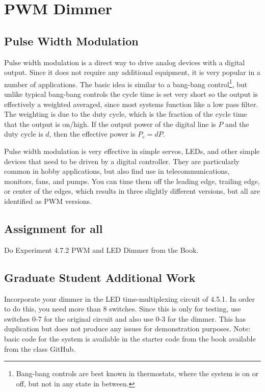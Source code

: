 \chapter{PWM Dimmer}

\section{Pulse Width Modulation}

Pulse width modulation is a direct way to drive analog devices with a digital output.  Since it does not require any additional equipment, it is very popular in a number of applications.  The basic idea is similar to a bang-bang control\footnote{Bang-bang controls are best known in thermostats, where the system is on or off, but not in any state in between.}, but unlike typical bang-bang controls the cycle time is set very short so the output is effectively a weighted averaged, since most systems function like a low pass filter.  The weighting is due to the duty cycle, which is the fraction of the cycle time that the output is on/high.  If the output power of the digital line is $P$ and the duty cycle is $d$, then the effective power is $P_e=d P$.

Pulse width modulation is very effective in simple servos, LEDs, and other simple devices that need to be driven by a digital controller.  They are particularly common in hobby applications, but also find use in telecommunications, monitors, fans, and pumps.  You can time them off the leading edge, trailing edge, or center of the edges, which results in three slightly different versions, but all are identified as PWM versions.

\section{Assignment for all}

Do Experiment 4.7.2 PWM and LED Dimmer from the Book.

\section{Graduate Student Additional Work}

Incorporate your dimmer in the LED time-multiplexing circuit of 4.5.1.  In order to do this, you need more than 8 switches.  Since this is only for testing, use switches 0-7 for the original circuit and also use 0-3 for the dimmer.  This has duplication but does not produce any issues for demonstration purposes.  Note: basic code for the system is available in the starter code from the book available from the class GitHub. 
